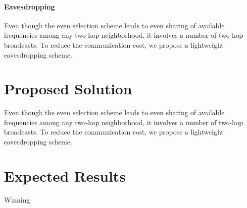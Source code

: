 \documentclass[acmtog, authorversion]{acmart}
\begin{document}
\paragraph{Eavesdropping}

Even though the even selection scheme leads to even sharing of
available frequencies among any two-hop neighborhood, it involves a
number of two-hop broadcasts. To reduce the communication cost, we
propose a lightweight eavesdropping scheme.

\section{Proposed Solution}
Even though the even selection scheme leads to even sharing of
available frequencies among any two-hop neighborhood, it involves a
number of two-hop broadcasts. To reduce the communication cost, we
propose a lightweight eavesdropping scheme.

\section{Expected Results}
Winning



\end{document}
